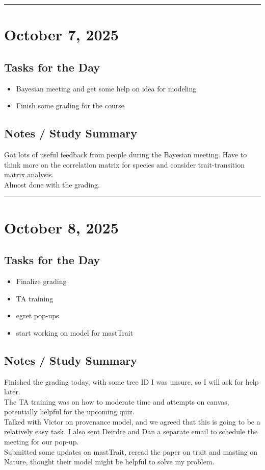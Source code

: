 \documentclass[12pt]{article}
\begin{document}
\vspace{1em}
\hrule
\vspace{1em}

\section*{October 7, 2025}

\subsection*{Tasks for the Day}
\begin{itemize}
    \item Bayesian meeting and get some help on idea for modeling
    \item Finish some grading for the course
\end{itemize}
\subsection*{Notes / Study Summary}
Got lots of useful feedback from people during the Bayesian meeting. Have to think more on the correlation matrix for species and consider trait-transition matrix analysis.\\
Almost done with the grading.

\vspace{1em}
\hrule
\vspace{1em}

\section*{October 8, 2025}

\subsection*{Tasks for the Day}
\begin{itemize}
    \item Finalize grading
    \item TA training
    \item egret pop-ups
    \item start working on model for mastTrait
\end{itemize}
\subsection*{Notes / Study Summary}
Finished the grading today, with some tree ID I was unsure, so I will ask for help later.\\
The TA training was on how to moderate time and attempts on canvas, potentially helpful for the upcoming quiz.\\
Talked with Victor on provenance model, and we agreed that this is going to be a relatively easy task. I also sent Deirdre and Dan a separate email to schedule the meeting for our pop-up.\\
Submitted some updates on mastTrait, reread the paper on trait and masting on Nature, thought their model might be helpful to solve my problem.
\end{document}
